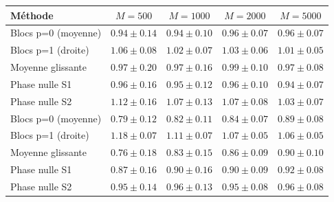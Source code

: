 \begin{tabular}{lcccc}
\toprule
Méthode & $M=500$ & $M=1000$ & $M=2000$ & $M=5000$ \\
\midrule
Blocs p=0 (moyenne) & $0.94 \pm 0.14$ & $0.94 \pm 0.10$ & $0.96 \pm 0.07$ & $0.96 \pm 0.07$ \\
Blocs p=1 (droite) & $1.06 \pm 0.08$ & $1.02 \pm 0.07$ & $1.03 \pm 0.06$ & $1.01 \pm 0.05$ \\
Moyenne glissante & $0.97 \pm 0.20$ & $0.97 \pm 0.16$ & $0.99 \pm 0.10$ & $0.97 \pm 0.08$ \\
Phase nulle S1 & $0.96 \pm 0.16$ & $0.95 \pm 0.12$ & $0.96 \pm 0.10$ & $0.94 \pm 0.07$ \\
Phase nulle S2 & $1.12 \pm 0.16$ & $1.07 \pm 0.13$ & $1.07 \pm 0.08$ & $1.03 \pm 0.07$ \\
\midrule
Blocs p=0 (moyenne) & $0.79 \pm 0.12$ & $0.82 \pm 0.11$ & $0.84 \pm 0.07$ & $0.89 \pm 0.08$ \\
Blocs p=1 (droite) & $1.18 \pm 0.07$ & $1.11 \pm 0.07$ & $1.07 \pm 0.05$ & $1.06 \pm 0.05$ \\
Moyenne glissante & $0.76 \pm 0.18$ & $0.83 \pm 0.15$ & $0.86 \pm 0.09$ & $0.90 \pm 0.10$ \\
Phase nulle S1 & $0.87 \pm 0.16$ & $0.90 \pm 0.16$ & $0.90 \pm 0.09$ & $0.92 \pm 0.08$ \\
Phase nulle S2 & $0.95 \pm 0.14$ & $0.96 \pm 0.13$ & $0.95 \pm 0.08$ & $0.96 \pm 0.08$ \\
\bottomrule
\end{tabular}

